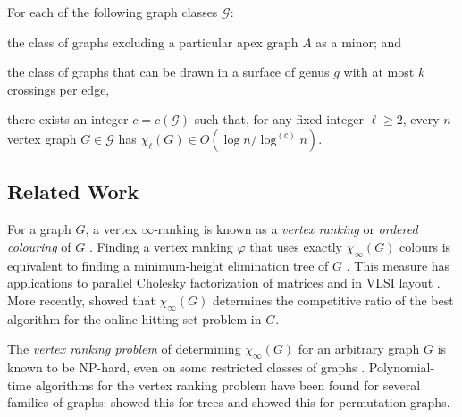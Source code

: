 \documentclass[kpfonts]{patmorin}
\newcommand{\lrn}{\chi_{\ell}}
\theoremstyle{named}
\begin{document}
\begin{thm}\label{meta-theorem}\label{meta}
    For each of the following graph classes $\mathcal{G}$:
    \begin{compactenum}
        \item the class of graphs excluding a particular apex graph $A$ as a minor; and
        \item the class of graphs that can be drawn in a surface of genus $g$ with at most $k$ crossings per edge,
    \end{compactenum}
    there exists an integer $c=c(\mathcal{G})$ such that, for any fixed integer $\ell\ge 2$, every $n$-vertex graph $G\in\mathcal{G}$ has $\lrn(G)\in O(\log n/\log^{(c)} n)$.
\end{thm}



\subsection{Related Work}

For a graph $G$, a vertex $\infty$-ranking is known as a \emph{vertex ranking} \cite{bodlaender.deogun.ea:rankings} or \emph{ordered colouring} of $G$ \cite{katchalski.mccuaig.ea:ordered}.  Finding a vertex ranking $\varphi$ that uses exactly $\chi_\infty(G)$ colours is equivalent to finding a minimum-height elimination tree of $G$ \cite{torre.greenlaw.ea:optimal,deogun.kloks.ea:on}.  This measure has applications to parallel Cholesky factorization of matrices \cite{bodlaender.gilbert.ea:approximating,duff.reid:multifrontal,liu:role,dereniowski.kubale:cholesky} and in VLSI layout \cite{leiserson:area,sen.deng.ea:on}.  More recently, \citet{even.smorodinsky:hitting} showed that $\chi_\infty(G)$ determines the competitive ratio of the best algorithm for the online hitting set problem in $G$.

The \emph{vertex ranking problem} of determining $\chi_\infty(G)$ for an arbitrary graph $G$ is known to be NP-hard, even on some restricted classes of graphs \cite{bodlaender.deogun.ea:rankings,llewellyn.tovey.ea:local,llewellyn.tovey.ea:erratum,dereniowski.nadolski:vertex}. Polynomial-time algorithms for the vertex ranking problem have been found for several families of graphs: \citet{schaeffer:optimal} showed this for trees and \citet{deogun.kloks.ea:on} showed this for permutation graphs.
\end{document}
